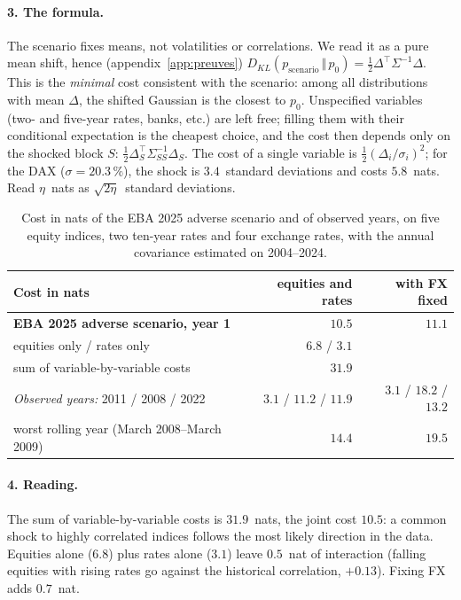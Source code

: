 \documentclass[11pt]{article}
\theoremstyle{definition}
\newcommand{\KL}[2]{D_{KL}\!\left(#1\,\Vert\,#2\right)}
\begin{document}
\paragraph{3. The formula.} The scenario fixes means, not volatilities or
correlations. We read it as a pure mean shift, hence
(appendix~\ref{app:preuves}) $\KL{p_{\text{scenario}}}{p_0}=\tfrac12\Delta^\top
\Sigma^{-1}\Delta$. This is the \emph{minimal} cost consistent with the
scenario: among all distributions with mean $\Delta$, the shifted Gaussian is
the closest to $p_0$. Unspecified variables (two- and five-year rates, banks,
etc.) are left free; filling them with their conditional expectation is the
cheapest choice, and the cost then depends only on the shocked block $S$:
$\tfrac12\Delta_S^\top\Sigma_{SS}^{-1}\Delta_S$. The cost of a single variable
is $\tfrac12(\Delta_i/\sigma_i)^2$; for the DAX ($\sigma=20.3\,\%$), the shock
is $3.4$~standard deviations and costs $5.8$~nats. Read $\eta$~nats as
$\sqrt{2\eta}$~standard deviations.

\begin{table}[t]
\centering
\small
\begin{tabular}{@{}lrr@{}}
\toprule
Cost in nats & equities and rates & with FX fixed \\
\midrule
\textbf{EBA 2025 adverse scenario, year 1} & $\mathbf{10.5}$ & $\mathbf{11.1}$ \\
\quad equities only / rates only & $6.8$ / $3.1$ & \\
\quad sum of variable-by-variable costs & $31.9$ & \\
\midrule
\emph{Observed years:} 2011 / 2008 / 2022 & $3.1$ / $11.2$ / $11.9$ & $3.1$ / $18.2$ / $13.2$ \\
\quad worst rolling year (March 2008--March 2009) & $14.4$ & $19.5$ \\
\bottomrule
\end{tabular}
\caption{Cost in nats of the EBA 2025 adverse scenario and of observed years,
on five equity indices, two ten-year rates and four exchange rates, with the
annual covariance estimated on 2004--2024.}
\label{tab:eba}
\end{table}

\paragraph{4. Reading.} The sum of variable-by-variable costs is
$31.9$~nats, the joint cost $10.5$: a common shock to highly correlated indices
follows the most likely direction in the data. Equities alone ($6.8$) plus
rates alone ($3.1$) leave $0.5$~nat of interaction (falling equities with
rising rates go against the historical correlation, $+0.13$). Fixing FX adds
$0.7$~nat.
\end{document}
